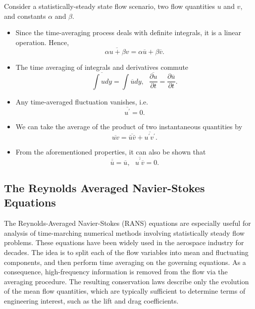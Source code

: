 Consider a statistically-steady state flow scenario, two flow quantities $u$ and $v$, and constants $\alpha$ and $\beta$.

\begin{itemize}
\item Since the time-averaging process deals with definite integrals, it is a linear operation. Hence, 
\begin{equation}
	\overline{\alpha u + \beta v} = \alpha \overline{u} + \beta \overline{v}.
	\label{eq:reynolds_sum}
\end{equation}
\item The time averaging of integrals and derivatives commute
\begin{equation}
	\overline{\int u dy} = \int \overline{u} dy,  ~~~ \overline{\frac{\partial u}{\partial t}} = \frac{\partial \overline{u}}{\partial t}.
	\label{eq:reynolds_commute}
\end{equation}
\item Any time-averaged fluctuation vanishes, i.e. 
\begin{equation}
	\overline{u^\prime}=0.
	\label{eq:reynolds_fluct}
\end{equation}
\item We can take the average of the product of two instantaneous quantities by
\begin{equation}
	\overline{uv} = \overline{\bar{u}\bar{v}} + \overline{u^\prime v^\prime}.
	\label{eq:reynolds_prod}
\end{equation}
\item From the aforementioned properties, it can also be shown that
\begin{equation}
	\overline{\overline{u}} = \overline{u}, ~~~ \overline{u^\prime \overline{v}} = 0.
	\label{eq:reynolds_avgfluct}
\end{equation}
\end{itemize}

\subsection{The Reynolds Averaged Navier-Stokes Equations}

The Reynolds-Averaged Navier-Stokes (RANS) equations are especially useful for analysis of time-marching numerical methods involving statistically steady flow problems. These equations have been widely used in the aerospace industry for decades. The idea is to split each of the flow variables into mean and fluctuating components, and then perform time averaging on the governing equations. As a consequence, high-frequency information is removed from the flow via the averaging procedure. The resulting conservation laws describe only the evolution of the mean flow quantities, which are typically sufficient to determine terms of engineering interest, such as the lift and drag coefficients.


